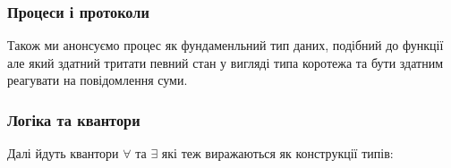 \documentclass[11pt,oneside]{article}
\begin{document}
  \subsubsection*{Процеси і протоколи}

Також ми анонсуємо процес як фундаменльний тип даних, подібний до функції але який здатний
тритати певний стан у вигляді типа коротежа та бути здатним реагувати на повідомлення суми.

\begin{prooftree}
\end{prooftree}

\begin{prooftree}
\end{prooftree}

\begin{prooftree}
\end{prooftree}


\newpage

  \subsubsection*{Логіка та квантори}

Далі йдуть квантори $\forall$ та $\exists$ які теж виражаються як конструкції типів:
\end{document}
